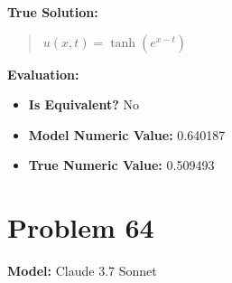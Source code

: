 \documentclass{article}
\begin{document}
\textbf{True Solution:}
\begin{quote}
$u(x,t) = \tanh(e^{x - t})$
\end{quote}

\textbf{Evaluation:}
\begin{itemize}
\item \textbf{Is Equivalent?} No
\item \textbf{Model Numeric Value:} 0.640187
\item \textbf{True Numeric Value:} 0.509493
\end{itemize}
\vspace{1cm}
\section*{Problem 64}
\textbf{Model:} Claude 3.7 Sonnet
\end{document}
